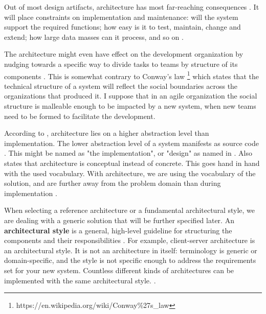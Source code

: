 \documentclass[utf8,english]{gradu3}
\begin{document}
Out of most design artifacts, architecture has most far-reaching consequences
\parencite[31]{Bass1998}. It will place constraints on implementation and
maintenance: will the system support the required functions;
how easy is it to test, maintain, change and extend; how large data masses can
it process, and so on \parencite{Koskimies2005}.

The architecture might even have effect on the development organization by
nudging towards a specific way to divide tasks to teams by structure of its
components \parencite[31]{Bass1998}. This is somewhat contrary to Conway's law
\footnote{https://en.wikipedia.org/wiki/Conway\%27s\_law} which states that the
technical structure of a system will reflect the social boundaries across the
organizations that produced it. I suppose that in an agile organization the
social structure is malleable enough to be impacted by a new system, when new
teams need to be formed to facilitate the development.

According to \textcite{Koskimies2005}, architecture lies on a higher
abstraction level than implementation. The lower abstraction level of a system
manifests as source code \parencite[24]{Bass1998}. This might be named as "the
implementation", or "design" as named in \textcite{IEEE12207}. Also \textcite[4]{IEEE42010} states
that architecture is conceptual instead of concrete. This goes hand in hand with
the used vocabulary. With architecture, we are using the vocabulary of the
solution, and are further away from the problem domain than during
implementation \parencite{Koskimies2005}.

When selecting a reference architecture or a fundamental
architectural style, we are dealing with a generic solution that will be further
specified later. An \textbf{architectural style} is a general, high-level guideline for
structuring the components and their responsibilities \parencite[24]{Bass1998}. For
example, client-server architecture is an architectural style. It is not an
architecture in itself: terminology is generic or domain-specific, and the style
is not specific enough to address the requirements set for your new system.
Countless different kinds of architectures can be implemented with the same
architectural style. \parencite[24]{Bass1998}.
\end{document}
